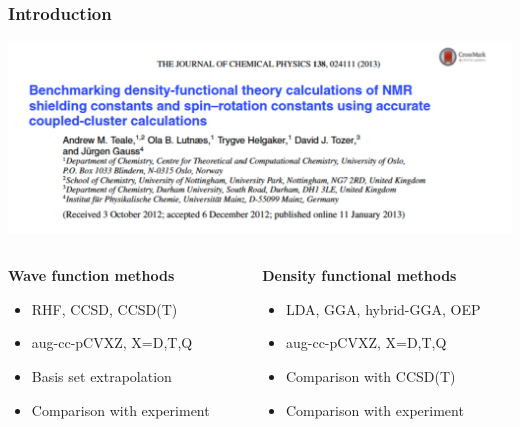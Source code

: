 \begin{frame}
\frametitle{Introduction}
\centering
\includegraphics[scale=0.35]{figures/Teale_etal_2013.pdf}

\vspace{10mm}

\begin{columns}
\begin{column}[b]{0.5\textwidth}
    \textbf{Wave function methods}
    \begin{itemize}
        \item   RHF, CCSD, CCSD(T)
        \item   aug-cc-pCVXZ, X=D,T,Q
        \item   Basis set extrapolation
        \item   Comparison with experiment
    \end{itemize}
\end{column}
\begin{column}[b]{0.5\textwidth}
    \textbf{Density functional methods}
    \begin{itemize}
        \item   LDA, GGA, hybrid-GGA, OEP
        \item   aug-cc-pCVXZ, X=D,T,Q
        \item   Comparison with CCSD(T)
        \item   Comparison with experiment
    \end{itemize}
\end{column}
\end{columns}
\end{frame}
